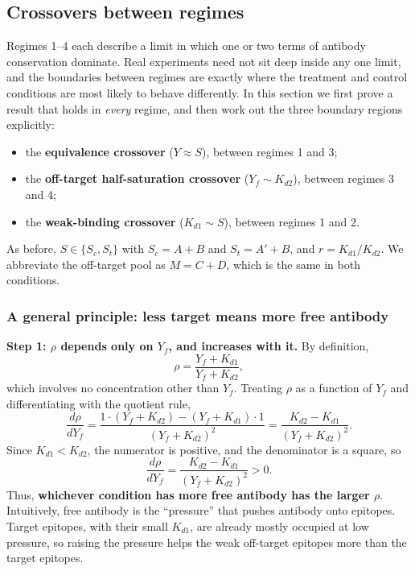 \subsection{Crossovers between regimes}

Regimes 1--4 each describe a limit in which one or two terms of antibody
conservation dominate. Real experiments need not sit deep inside any one
limit, and the boundaries between regimes are exactly where the
treatment and control conditions are most likely to behave differently.
In this section we first prove a result that holds in \emph{every}
regime, and then work out the three boundary regions explicitly:
\begin{itemize}
    \item the \textbf{equivalence crossover} ($Y\approx S$), between
    regimes 1 and 3;
    \item the \textbf{off-target half-saturation crossover}
    ($Y_f\sim K_{d2}$), between regimes 3 and 4;
    \item the \textbf{weak-binding crossover} ($K_{d1}\sim S$), between
    regimes 1 and 2.
\end{itemize}
As before, $S\in\{S_c,S_t\}$ with $S_c=A+B$ and $S_t=A'+B$, and
$r=K_{d1}/K_{d2}$. We abbreviate the off-target pool as $M=C+D$, which is
the same in both conditions.

\subsubsection{A general principle: less target means more free antibody}

\textbf{Step 1: $\rho$ depends only on $Y_f$, and increases with it.}
By definition,
$$
\rho=\frac{Y_f+K_{d1}}{Y_f+K_{d2}},
$$
which involves no concentration other than $Y_f$. Treating $\rho$ as a
function of $Y_f$ and differentiating with the quotient rule,
$$
\frac{d\rho}{dY_f}
=\frac{1\cdot(Y_f+K_{d2})-(Y_f+K_{d1})\cdot1}{(Y_f+K_{d2})^2}
=\frac{K_{d2}-K_{d1}}{(Y_f+K_{d2})^2}.
$$
Since $K_{d1}<K_{d2}$, the numerator is positive, and the denominator is a
square, so
\begin{equation}
\frac{d\rho}{dY_f}=\frac{K_{d2}-K_{d1}}{(Y_f+K_{d2})^2}>0.
\label{eq:x-drho}
\end{equation}
Thus, \textbf{whichever condition has more free antibody has the larger
$\rho$}. Intuitively, free antibody is the ``pressure'' that pushes
antibody onto epitopes. Target epitopes, with their small $K_{d1}$, are
already mostly occupied at low pressure, so raising the pressure helps
the weak off-target epitopes more than the target epitopes.

